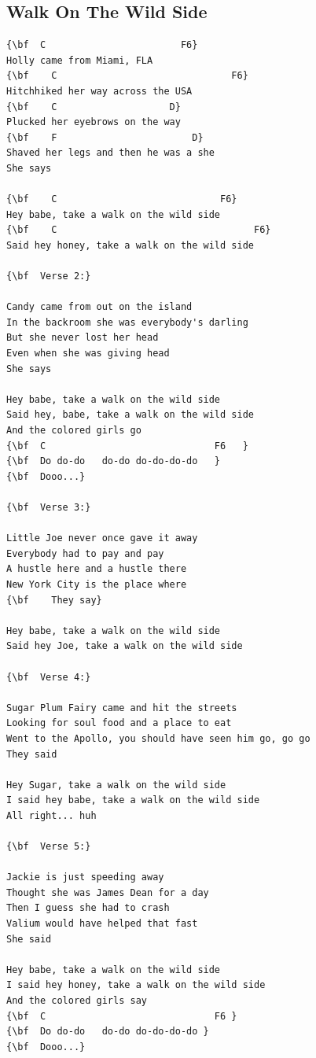 \documentclass[a4paper]{article}
\begin{document}
\subsection{Walk On The Wild Side}
\begin{Verbatim}[commandchars=\\\{\}]
{\bf  C                        F6}
Holly came from Miami, FLA
{\bf    C                               F6}
Hitchhiked her way across the USA
{\bf    C                    D}
Plucked her eyebrows on the way
{\bf    F                        D}
Shaved her legs and then he was a she
She says

{\bf    C                             F6}
Hey babe, take a walk on the wild side
{\bf    C                                   F6}
Said hey honey, take a walk on the wild side

{\bf  Verse 2:}

Candy came from out on the island
In the backroom she was everybody's darling
But she never lost her head
Even when she was giving head
She says

Hey babe, take a walk on the wild side
Said hey, babe, take a walk on the wild side
And the colored girls go
{\bf  C                              F6   }
{\bf  Do do-do   do-do do-do-do-do   }
{\bf  Dooo...}

{\bf  Verse 3:}

Little Joe never once gave it away
Everybody had to pay and pay
A hustle here and a hustle there
New York City is the place where
{\bf    They say}

Hey babe, take a walk on the wild side
Said hey Joe, take a walk on the wild side

{\bf  Verse 4:}

Sugar Plum Fairy came and hit the streets
Looking for soul food and a place to eat
Went to the Apollo, you should have seen him go, go go
They said

Hey Sugar, take a walk on the wild side
I said hey babe, take a walk on the wild side
All right... huh

{\bf  Verse 5:}

Jackie is just speeding away
Thought she was James Dean for a day
Then I guess she had to crash
Valium would have helped that fast
She said

Hey babe, take a walk on the wild side
I said hey honey, take a walk on the wild side
And the colored girls say
{\bf  C                              F6 }
{\bf  Do do-do   do-do do-do-do-do }
{\bf  Dooo...}

\end{Verbatim}
\newpage
\end{document}

